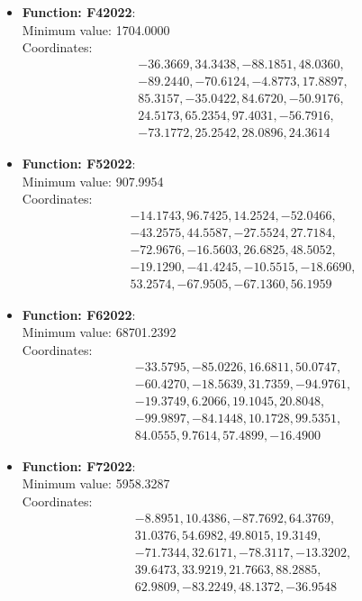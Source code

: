 \documentclass{article}
\begin{document}
\begin{itemize}
  \item \textbf{Function: F42022}: \\
    Minimum value: 1704.0000 \\
    Coordinates:
    \[
      \begin{aligned}
        & -36.3669, 34.3438, -88.1851, 48.0360, \\
        & -89.2440, -70.6124, -4.8773, 17.8897, \\
        & 85.3157, -35.0422, 84.6720, -50.9176, \\
        & 24.5173, 65.2354, 97.4031, -56.7916, \\
        & -73.1772, 25.2542, 28.0896, 24.3614
      \end{aligned}
    \]

  \item \textbf{Function: F52022}: \\
    Minimum value: 907.9954 \\
    Coordinates:
    \[
      \begin{aligned}
        & -14.1743, 96.7425, 14.2524, -52.0466, \\
        & -43.2575, 44.5587, -27.5524, 27.7184, \\
        & -72.9676, -16.5603, 26.6825, 48.5052, \\
        & -19.1290, -41.4245, -10.5515, -18.6690, \\
        & 53.2574, -67.9505, -67.1360, 56.1959
      \end{aligned}
    \]

  \item \textbf{Function: F62022}: \\
    Minimum value: 68701.2392 \\
    Coordinates:
    \[
      \begin{aligned}
        & -33.5795, -85.0226, 16.6811, 50.0747, \\
        & -60.4270, -18.5639, 31.7359, -94.9761, \\
        & -19.3749, 6.2066, 19.1045, 20.8048, \\
        & -99.9897, -84.1448, 10.1728, 99.5351, \\
        & 84.0555, 9.7614, 57.4899, -16.4900
      \end{aligned}
    \]

  \item \textbf{Function: F72022}: \\
    Minimum value: 5958.3287 \\
    Coordinates:
    \[
      \begin{aligned}
        & -8.8951, 10.4386, -87.7692, 64.3769, \\
        & 31.0376, 54.6982, 49.8015, 19.3149, \\
        & -71.7344, 32.6171, -78.3117, -13.3202, \\
        & 39.6473, 33.9219, 21.7663, 88.2885, \\
        & 62.9809, -83.2249, 48.1372, -36.9548
      \end{aligned}
    \]


\end{itemize}
\end{document}
